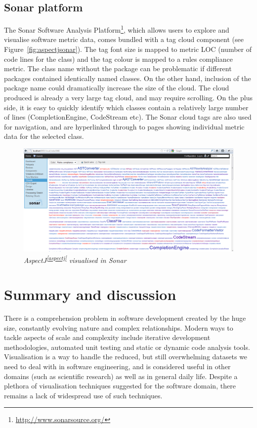 \subsection{Sonar platform} 

The Sonar Software Analysis Platform\footnote{\url{http://www.sonarsource.org/}}, which allows users to explore and visualise software metric data, comes bundled with a tag cloud component (see Figure~\vref{fig:aspectjsonar}). The tag font size is mapped to metric LOC (number of code lines for the class) and the tag colour is mapped to a rules compliance metric. The class name without the package can be problematic if different packages contained identically named classes. On the other hand, inclusion of the package name could dramatically increase the size of the cloud. The cloud produced is already a very large tag cloud, and may require scrolling. On the plus side, it is easy to quickly identify which classes contain a relatively large number of lines (CompletionEngine, CodeStream etc). The Sonar cloud tags are also used for navigation, and are hyperlinked through to pages showing individual metric data for the selected class. 

\begin{figure}[!htb]
   \centering
   \includegraphics[scale=0.40]{sonarcloud.png}
  \caption{\textit{AspectJ\textsuperscript{\ref{aspectj}} visualised in Sonar}}
  \label{fig:aspectjsonar}
\end{figure}

\section{Summary and discussion} 

There is a comprehension problem in software development created by the huge size, constantly evolving nature and complex relationships. Modern ways to tackle aspects of scale and complexity include iterative development methodologies, automated unit testing and static or dynamic code analysis tools. Visualisation is a way to handle the reduced, but still overwhelming datasets we need to deal with in software engineering, and is considered useful in other domains (such as scientific research) as well as in general daily life. Despite a plethora of visualisation techniques suggested for the software domain, there remains a lack of widespread use of such techniques. 

